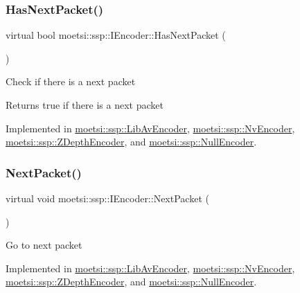 \subsubsection{\texorpdfstring{Has\+Next\+Packet()}{HasNextPacket()}\hspace{0.1cm}{\footnotesize\ttfamily [2/2]}}
{\footnotesize\ttfamily virtual bool moetsi\+::ssp\+::\+I\+Encoder\+::\+Has\+Next\+Packet (\begin{DoxyParamCaption}{ }\end{DoxyParamCaption})\hspace{0.3cm}{\ttfamily [pure virtual]}}

Check if there is a next packet \begin{DoxyReturn}{Returns}
true if there is a next packet 
\end{DoxyReturn}


Implemented in \hyperlink{classmoetsi_1_1ssp_1_1LibAvEncoder_a306c0935fa37bd35ddfeb8290289e927}{moetsi\+::ssp\+::\+Lib\+Av\+Encoder}, \hyperlink{classmoetsi_1_1ssp_1_1NvEncoder_a4c0874d9d0d767ae7a33fe9c9a1be1de}{moetsi\+::ssp\+::\+Nv\+Encoder}, \hyperlink{classmoetsi_1_1ssp_1_1ZDepthEncoder_ac11aa1369150c2aa5ffa1d70d4e6ad5d}{moetsi\+::ssp\+::\+Z\+Depth\+Encoder}, and \hyperlink{classmoetsi_1_1ssp_1_1NullEncoder_a359eb668c16a1ef7963214f7f6303af4}{moetsi\+::ssp\+::\+Null\+Encoder}.

\mbox{\label{classmoetsi_1_1ssp_1_1IEncoder_afac3ddcf2f49be16020c83cb9e0fb274}} 
\subsubsection{\texorpdfstring{Next\+Packet()}{NextPacket()}\hspace{0.1cm}{\footnotesize\ttfamily [1/2]}}
{\footnotesize\ttfamily virtual void moetsi\+::ssp\+::\+I\+Encoder\+::\+Next\+Packet (\begin{DoxyParamCaption}{ }\end{DoxyParamCaption})\hspace{0.3cm}{\ttfamily [pure virtual]}}

Go to next packet 

Implemented in \hyperlink{classmoetsi_1_1ssp_1_1LibAvEncoder_acf5e6e2f172d24778c7942c8cd37330b}{moetsi\+::ssp\+::\+Lib\+Av\+Encoder}, \hyperlink{classmoetsi_1_1ssp_1_1NvEncoder_a1c6d801fbb40e7dea2b33dd2ac154919}{moetsi\+::ssp\+::\+Nv\+Encoder}, \hyperlink{classmoetsi_1_1ssp_1_1ZDepthEncoder_ae3911f396fc8b86c04c94dc71e1c0672}{moetsi\+::ssp\+::\+Z\+Depth\+Encoder}, and \hyperlink{classmoetsi_1_1ssp_1_1NullEncoder_a5fe7215f2b462690208b2a144e962e14}{moetsi\+::ssp\+::\+Null\+Encoder}.

